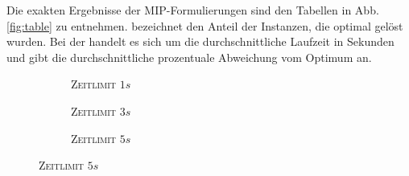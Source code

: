 Die exakten Ergebnisse der MIP-Formulierungen sind den Tabellen in Abb. \ref{fig:table} zu entnehmen.
 bezeichnet den Anteil der Instanzen, die optimal gelöst wurden. Bei der  handelt
es sich um die durchschnittliche Laufzeit in Sekunden und  gibt die durchschnittliche prozentuale Abweichung
vom Optimum an.

\begin{figure}[H]
\centering

\begin{subfigure}[b]{0.3\textwidth}
\centering
{}
\caption{\textsc{Zeitlimit} $1s$}
\label{fig:res_b=2_s_a}
\end{subfigure}
\begin{subfigure}[b]{0.3\textwidth}
\centering
{}
\caption{\textsc{Zeitlimit} $3s$}
\label{fig:res_b=2_s_b}
\end{subfigure}
\begin{subfigure}[b]{0.3\textwidth}
\centering
{}
\caption{\textsc{Zeitlimit} $5s$}
\label{fig:res_b=2_s_c}
\end{subfigure}


\end{figure}
